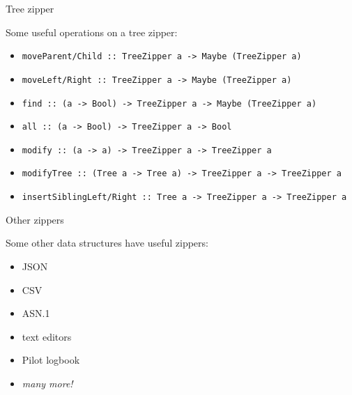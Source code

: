 \begin{frame}[fragile]
\begin{block}{Tree zipper}
\begin{center}
Some useful operations on a tree zipper:
\begin{itemize}
  \item \tiny{\lstinline{moveParent/Child :: TreeZipper a -> Maybe (TreeZipper a)}}
  \item \tiny{\lstinline{moveLeft/Right :: TreeZipper a -> Maybe (TreeZipper a)}}
  \item \tiny{\lstinline{find :: (a -> Bool) -> TreeZipper a -> Maybe (TreeZipper a)}}
  \item \tiny{\lstinline{all :: (a -> Bool) -> TreeZipper a -> Bool}}
  \item \tiny{\lstinline{modify :: (a -> a) -> TreeZipper a -> TreeZipper a}}
  \item \tiny{\lstinline{modifyTree :: (Tree a -> Tree a) -> TreeZipper a -> TreeZipper a}}
  \item \tiny{\lstinline{insertSiblingLeft/Right :: Tree a -> TreeZipper a -> TreeZipper a}}
\end{itemize}
\end{center}
\end{block}
\end{frame}

\begin{frame}[fragile]
\begin{block}{Other zippers}
\begin{center}
Some other data structures have useful zippers:
\begin{itemize}
  \item JSON
  \item CSV
  \item ASN.1
  \item text editors
  \item Pilot logbook
  \item \emph{many more!}
\end{itemize}
\end{center}
\end{block}
\end{frame}
